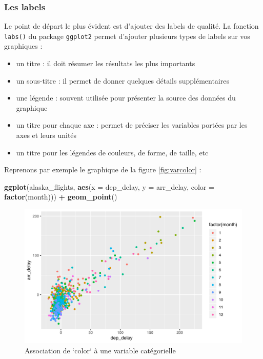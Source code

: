 \documentclass[a4paperpaper,]{article}
\newenvironment{Shaded}{\begin{snugshade}}{\end{snugshade}}
\newcommand{\KeywordTok}[1]{\textcolor[rgb]{0.13,0.29,0.53}{\textbf{#1}}}
\newcommand{\DataTypeTok}[1]{\textcolor[rgb]{0.13,0.29,0.53}{#1}}
\newcommand{\StringTok}[1]{\textcolor[rgb]{0.31,0.60,0.02}{#1}}
\newcommand{\OperatorTok}[1]{\textcolor[rgb]{0.81,0.36,0.00}{\textbf{#1}}}
\newcommand{\NormalTok}[1]{#1}
\providecommand{\tightlist}{%
  \setlength{\itemsep}{0pt}\setlength{\parskip}{0pt}}
\theoremstyle{definition}
\theoremstyle{definition}
\theoremstyle{definition}
\theoremstyle{remark}
\begin{document}
\subsubsection{Les labels}\label{les-labels}

Le point de départ le plus évident est d'ajouter des labels de qualité.
La fonction \texttt{labs()} du package \texttt{ggplot2} permet d'ajouter
plusieurs types de labels sur vos graphiques :

\begin{itemize}
\tightlist
\item
  un titre : il doit résumer les résultats les plus importants
\item
  un sous-titre : il permet de donner quelques détails supplémentaires
\item
  une légende : souvent utilisée pour présenter la source des données du
  graphique
\item
  un titre pour chaque axe : permet de préciser les variables portées
  par les axes et leurs unités
\item
  un titre pour les légendes de couleurs, de forme, de taille, etc
\end{itemize}

Reprenons par exemple le graphique de la figure \ref{fig:varcolor} :

\begin{Shaded}
\begin{Highlighting}[]
\KeywordTok{ggplot}\NormalTok{(alaska_flights, }\KeywordTok{aes}\NormalTok{(}\DataTypeTok{x =}\NormalTok{ dep_delay, }\DataTypeTok{y =}\NormalTok{ arr_delay, }\DataTypeTok{color =} \KeywordTok{factor}\NormalTok{(month))) }\OperatorTok{+}
\StringTok{  }\KeywordTok{geom_point}\NormalTok{()}
\end{Highlighting}
\end{Shaded}

\begin{figure}[htpb]

{\centering \includegraphics[width=0.9\linewidth]{figure/varcolorlabel-1} 

}

\caption{Association de `color` à une variable catégorielle}\label{fig:varcolorlabel}
\end{figure}
\end{document}
